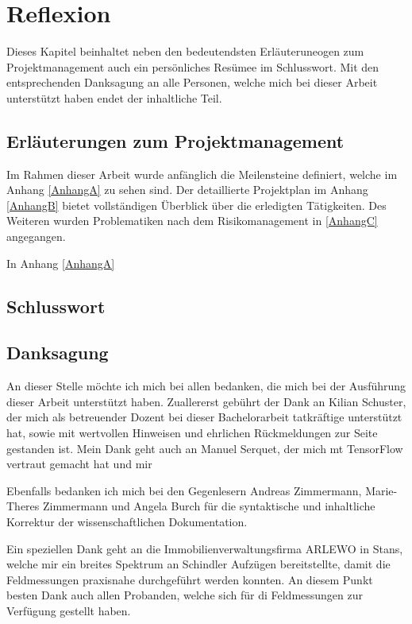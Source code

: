 \chapter{Reflexion}
\label{chap:Reflexion}

Dieses Kapitel beinhaltet neben den bedeutendsten Erläuteruneogen zum Projektmanagement auch ein persönliches Resümee im Schlusswort. Mit den entsprechenden Danksagung an alle Personen, welche mich bei dieser Arbeit unterstützt haben endet der inhaltliche Teil.


\section{Erläuterungen zum Projektmanagement}
Im Rahmen dieser Arbeit wurde anfänglich die Meilensteine definiert, welche im Anhang \ref{AnhangA} zu sehen sind. Der detaillierte Projektplan im Anhang \ref{AnhangB} bietet vollständigen Überblick über die erledigten Tätigkeiten. Des Weiteren wurden Problematiken nach dem Risikomanagement in \ref{AnhangC} angegangen.

In Anhang \ref{AnhangA}



 


\section{Schlusswort}



\section{Danksagung}

An dieser Stelle möchte ich mich bei allen bedanken, die mich bei der Ausführung dieser
Arbeit unterstützt haben. 
Zuallererst gebührt der Dank an Kilian Schuster, der mich als betreuender Dozent bei dieser Bachelorarbeit tatkräftige unterstützt hat, sowie mit wertvollen Hinweisen und ehrlichen Rückmeldungen zur Seite gestanden ist. Mein Dank geht auch an Manuel Serquet, der mich mt TensorFlow vertraut gemacht hat und mir 

Ebenfalls bedanken ich mich bei den Gegenlesern Andreas Zimmermann, Marie-Theres Zimmermann
und Angela Burch für die syntaktische und inhaltliche Korrektur der wissenschaftlichen
Dokumentation.

Ein speziellen Dank geht an die Immobilienverwaltungsfirma ARLEWO in Stans, welche mir ein breites Spektrum an Schindler Aufzügen bereitstellte, damit die Feldmessungen praxisnahe durchgeführt werden konnten. An diesem Punkt besten Dank auch allen Probanden, welche sich für di Feldmessungen zur Verfügung gestellt haben.